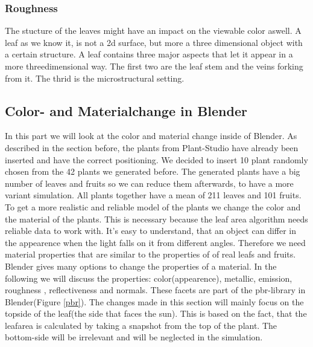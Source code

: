 \subsubsection*{Roughness}
The stucture of the leaves might have an impact on the viewable color aswell. A leaf as we know it, is not a 2d surface, but more a three dimensional object with a certain structure. A leaf contains three major aspects that let it appear in a more threedimensional way. The first two are the leaf stem and the veins forking from it. The thrid is the microstructural setting.

\subsection{Color- and Materialchange in Blender}


In this part we will look at the color and material change inside of Blender. As described in the section before, the plants from Plant-Studio have already been inserted and have the correct positioning. We decided to insert 10 plant randomly chosen from the 42 plants we generated before. The generated plants have a big number of leaves and fruits so we can reduce them afterwards, to have a more variant simulation. \newline
All plants together have a mean of 211 leaves and 101 fruits.
To get a more realistic and reliable model of the plants we change the color and the material of the plants. This is necessary because the leaf area algorithm needs reliable data to work with. It's easy to understand, that an object can differ in the appearence when the light falls on it from different angles. Therefore we need material properties that are similar to the properties of of real leafs and fruits.
Blender gives many options to change the properties of a material. In the following we will discuss the properties: color(appearence), metallic, emission, roughness , reflectiveness and normals. These facets are part of the pbr-library in Blender(Figure \ref{pbr}).
The changes made in this section will mainly focus on the topside of the leaf(the side that faces the sun). This is based on the fact, that the leafarea is calculated by taking a snapshot from the top of the plant. The bottom-side will be irrelevant and will be neglected in the simulation.

